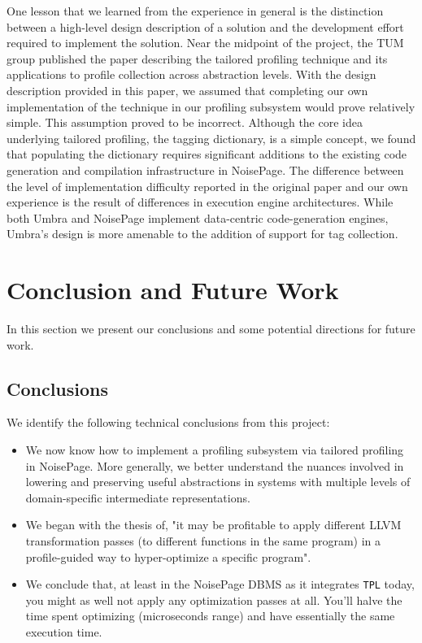 \documentclass{vldb}
\newcommand{\tpl}{\texttt{TPL}\xspace}
\begin{document}
One lesson that we learned from the experience in general is the distinction between a high-level design description of a solution and the development effort required to implement the solution. Near the midpoint of the project, the TUM group published the paper describing the tailored profiling technique and its applications to profile collection across abstraction levels. With the design description provided in this paper, we assumed that completing our own implementation of the technique in our profiling subsystem would prove relatively simple. This assumption proved to be incorrect. Although the core idea underlying tailored profiling, the tagging dictionary, is a simple concept, we found that populating the dictionary requires significant additions to the existing code generation and compilation infrastructure in NoisePage. The difference between the level of implementation difficulty reported in the original paper \cite{beischl21} and our own experience is the result of differences in execution engine architectures. While both Umbra \cite{umbra} and NoisePage implement data-centric code-generation engines, Umbra's design is more amenable to the addition of support for tag collection.


\section{Conclusion and Future Work}

In this section we present our conclusions and some potential directions for future work.

\subsection{Conclusions}

We identify the following technical conclusions from this project:
\begin{itemize}
    \item We now know how to implement a profiling subsystem via tailored profiling in NoisePage. More generally, we better understand the nuances involved in lowering and preserving useful abstractions in systems with multiple levels of domain-specific intermediate representations.
    \item We began with the thesis of, "it may be profitable to apply different LLVM transformation passes (to different functions in the same program) in a profile-guided way to hyper-optimize a specific program".
    \item We conclude that, at least in the NoisePage DBMS as it integrates \tpl today, you might as well not apply any optimization passes at all. You'll halve the time spent optimizing (microseconds range) and have essentially the same execution time.
\end{itemize}
\end{document}

